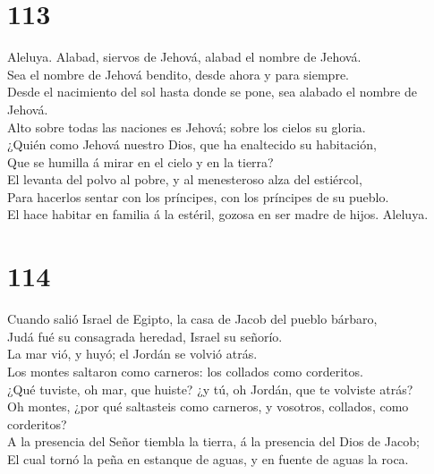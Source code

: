 \hypertarget{section-112}{%
\section{113}\label{section-112}}

 Aleluya. Alabad, siervos de Jehová, alabad el nombre de
Jehová.\\
 Sea el nombre de Jehová bendito, desde ahora y para
siempre.\\
 Desde el nacimiento del sol hasta donde se pone, sea
alabado el nombre de Jehová.\\
 Alto sobre todas las naciones es Jehová; sobre los cielos
su gloria.\\
 ¿Quién como Jehová nuestro Dios, que ha enaltecido su
habitación,\\
 Que se humilla á mirar en el cielo y en la tierra?\\
 El levanta del polvo al pobre, y al menesteroso alza del
estiércol,\\
 Para hacerlos sentar con los príncipes, con los príncipes
de su pueblo.\\
 El hace habitar en familia á la estéril, gozosa en ser
madre de hijos. Aleluya.

\hypertarget{section-113}{%
\section{114}\label{section-113}}

 Cuando salió Israel de Egipto, la casa de Jacob del pueblo
bárbaro,\\
 Judá fué su consagrada heredad, Israel su señorío.\\
 La mar vió, y huyó; el Jordán se volvió atrás.\\
 Los montes saltaron como carneros: los collados como
corderitos.\\
 ¿Qué tuviste, oh mar, que huiste? ¿y tú, oh Jordán, que te
volviste atrás?\\
 Oh montes, ¿por qué saltasteis como carneros, y vosotros,
collados, como corderitos?\\
 A la presencia del Señor tiembla la tierra, á la presencia
del Dios de Jacob;\\
 El cual tornó la peña en estanque de aguas, y en fuente de
aguas la roca.

